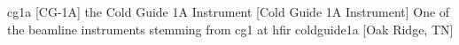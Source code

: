 \newglsXinstitution%
{cg1a}%
[CG{\--}1A]%
{the Cold Guide 1A Instrument}%
[Cold Guide 1A Instrument]%
{One of the \gls{beamline} instruments stemming from \gls{cg1} at \gls{hfir}}%
{coldguide1a}%
[Oak Ridge, TN]%